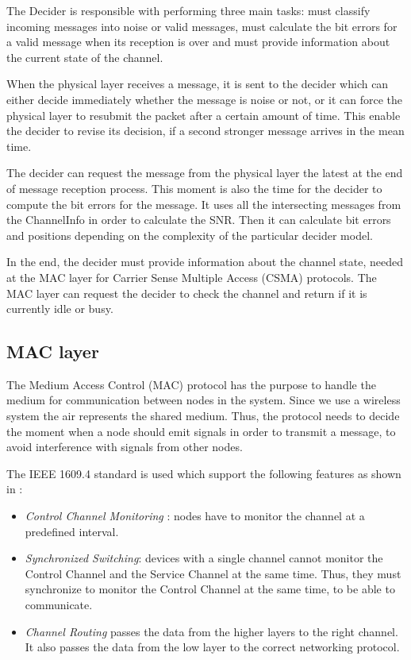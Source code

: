 The Decider is responsible with performing three main tasks: must classify
incoming messages into noise or valid messages, must calculate the bit errors
for a valid message when its reception is over and must provide information
about the current state of the channel.

When the physical layer receives a message, it is sent to the decider which can
either decide immediately whether the message is noise or not, or it can force
the physical layer to resubmit the packet after a certain amount of time. This
enable the decider to revise its decision, if a second stronger message arrives
in the mean time.

The decider can request the message from the physical layer the latest at the
end of message reception process. This moment is also the time for the decider
to compute the bit errors for the message. It uses all the intersecting
messages from the ChannelInfo in order to calculate the SNR. Then it can
calculate bit errors and positions depending on the complexity of the particular
decider model.

In the end, the decider must provide information about the channel state, needed
at the MAC layer for Carrier Sense Multiple Access (CSMA) protocols. The MAC
layer can request the decider to check the channel and return if it is currently
idle or busy.

\subsection{MAC layer}

The Medium Access Control (MAC) protocol has the purpose to handle the medium
for communication between nodes in the system. Since we use a wireless system
the air represents the shared medium. Thus, the protocol needs to decide the
moment when a node should emit signals in order to transmit a message, to avoid
interference with signals from other nodes.

The IEEE 1609.4 standard is used which support the following features as shown
in \cite{phule2012public}:

\begin{itemize}
  \item {\it Control Channel Monitoring} : nodes have to monitor the channel at
  a predefined interval.
  \item {\it Synchronized Switching}: devices with a single channel cannot
  monitor the Control Channel and the Service Channel at the same time. Thus,
  they must synchronize to monitor the Control Channel at the same time, to be
  able to communicate.
  \item {\it Channel Routing} passes the data from the higher layers to the
  right channel. It also passes the data from the low layer to the correct
  networking protocol.
\end{itemize}

